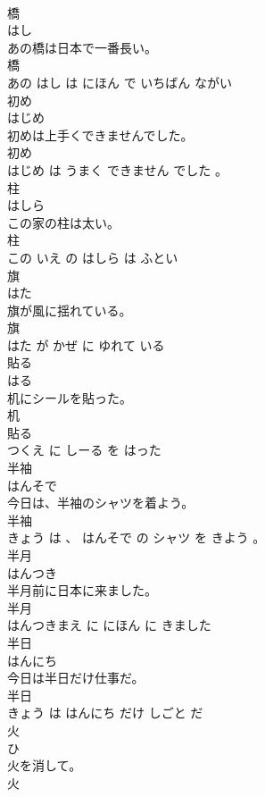 \documentclass[8pt]{extreport}
\begin{document}
\begin{CJK}{UTF8}{min}
\\	橋	
\\	はし			
\\	あの橋は日本で一番長い。	
\\	橋 
\\	あの はし は にほん で いちばん ながい			
\\	初め	
\\	はじめ			
\\	初めは上手くできませんでした。	
\\	初め 
\\	はじめ は うまく できません でした 。			
\\	柱	
\\	はしら			
\\	この家の柱は太い。	
\\	柱 
\\	この いえ の はしら は ふとい			
\\	旗	
\\	はた			
\\	旗が風に揺れている。	
\\	旗 
\\	はた が かぜ に ゆれて いる			
\\	貼る	
\\	はる			
\\	机にシールを貼った。	
\\	机 
\\	貼る 
\\	つくえ に しーる を はった			
\\	半袖	
\\	はんそで			
\\	今日は、半袖のシャツを着よう。	
\\	半袖 
\\	きょう は 、 はんそで の シャツ を きよう 。			
\\	半月	
\\	はんつき			
\\	半月前に日本に来ました。	
\\	半月 
\\	はんつきまえ に にほん に きました			
\\	半日	
\\	はんにち			
\\	今日は半日だけ仕事だ。	
\\	半日 
\\	きょう は はんにち だけ しごと だ			
\\	火	
\\	ひ			
\\	火を消して。	
\\	火 

\end{CJK}
\end{document}
